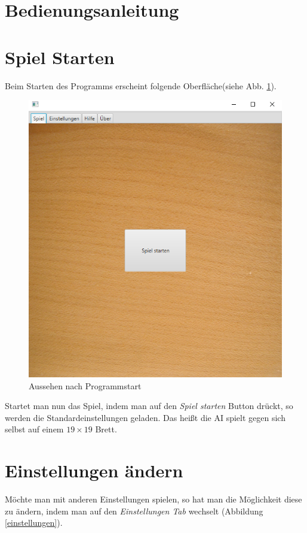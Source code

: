 \documentclass[11pt]{article}
\newcommand{\1}{{\mathds{1}}}
\newcommand{\imagewidth}{.6\textheight}%
\begin{document}
	
	\section*{Bedienungsanleitung}
	
	\section{Spiel Starten}
	Beim Starten des Programms erscheint folgende Oberfläche(siehe Abb. \ref{starten}).
	\FloatBarrier
	\begin{figure}[h]
		\centering
		\includegraphics[width=\imagewidth]{starten.png}
		\caption{Aussehen nach Programmstart}
		\label{starten}
	\end{figure}
	Startet man nun das Spiel, indem man auf den \textit{Spiel starten} Button drückt, so werden die Standardeinstellungen geladen.
	Das heißt die AI spielt gegen sich selbst auf einem $19 \times 19$ Brett. 

	\FloatBarrier
	
	\section{Einstellungen ändern}
	\FloatBarrier
	Möchte man mit anderen Einstellungen spielen, so hat man die Möglichkeit diese zu ändern, indem man auf den \textit{Einstellungen Tab} wechselt (Abbildung \ref{einstellungen}).
\end{document}
